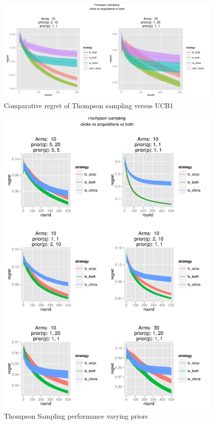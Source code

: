 \documentclass[11pt,a4,singlespacing,titlepagenumber=on]{scrreprt}
\numberwithin{equation}{chapter} %
\theoremstyle{remark}
\begin{document}
\begin{figure}[p]
    \centering
    \includegraphics[scale=0.5]{P4to5UCB}
    \caption{Comparative regret of Thompson sampling versus UCB1}
\end{figure}

\begin{figure}[p]
    \centering
    \includegraphics[scale=0.7]{P1to6.pdf}
    \caption{ Thompson Sampling performance varying priors }
\end{figure}
\end{document}
